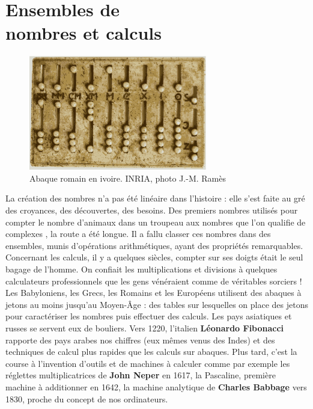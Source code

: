 \chapter{Ensembles de\\nombres et calculs} \label{N2}

\vfill

\begin{figure}[h]
   \centering
      \includegraphics[height=5cm]{Nombres_et_calculs/Images/N2_intro_abaque}
   \caption{Abaque romain en ivoire. INRIA, photo J.-M. Ramès}
\end{figure}

\vfill

\begin{prerequis}
   La création des nombres n'a pas été linéaire dans l'histoire : elle s'est faite au gré des croyances, des découvertes, des besoins. Des premiers nombres utilisés pour compter le nombre d'animaux dans un troupeau aux nombres que l'on qualifie de \og complexes \fg{}, la route a été longue. Il a fallu classer ces nombres dans des ensembles, munis d'opérations arithmétiques, ayant des propriétés remarquables. \\
   Concernant les calculs, il y a quelques siècles, compter sur ses doigts était le seul bagage de l'homme. On confiait les multiplications et divisions à quelques calculateurs professionnels que les gens vénéraient comme de véritables sorciers ! Les Babyloniens, les Grecs, les Romains et les Européens utilisent des abaques à jetons au moins jusqu'au Moyen-Âge : des tables sur lesquelles on place des jetons pour caractériser les nombres puis effectuer des calculs. Les pays asiatiques et russes se servent eux de bouliers. Vers 1220, l'italien {\bf Léonardo Fibonacci} rapporte des pays arabes nos chiffres (eux mêmes venus des Indes) et des techniques de calcul plus rapides que les calculs sur abaques. Plus tard, c'est la course à l'invention d'outils et de machines à calculer comme par exemple les réglettes multiplicatrices de {\bf John Neper} en 1617, la Pascaline, première machine à additionner en 1642, la machine analytique de {\bf Charles Babbage} vers 1830, proche du concept de nos ordinateurs.
\end{prerequis}


